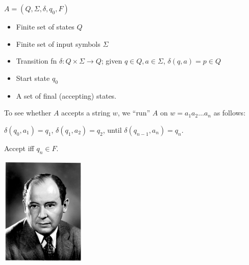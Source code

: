 \begin{frame}

$A=(Q,\Sigma,\delta,q_0,F)$

\begin{itemize}
\item  Finite set of states $Q$
\item  Finite set of input symbols $\Sigma$
\item  Transition fn $\delta:Q\times\Sigma\longrightarrow Q$;
given $q\in Q,a\in\Sigma$, $\delta(q,a)=p\in Q$ 
\item  Start state $q_0$
\item  A set of final (accepting) states.
\end{itemize}

To see whether $A$ accepts a string
$w$, we ``run'' $A$ on $w=a_1a_2\ldots a_n$ as follows:

$\delta(q_0,a_1)=q_1$, $\delta(q_1,a_2)=q_2$, until
$\delta(q_{n-1},a_n)=q_n$.  

Accept iff $q_n\in F$.
\end{frame}

\begin{frame}
\begin{minipage}{5cm}
\includegraphics[width=4cm]{figures/JohnvonNeumann.jpg}
\end{minipage}
\begin{minipage}{5cm}
 \\
\end{minipage}
\end{frame}


